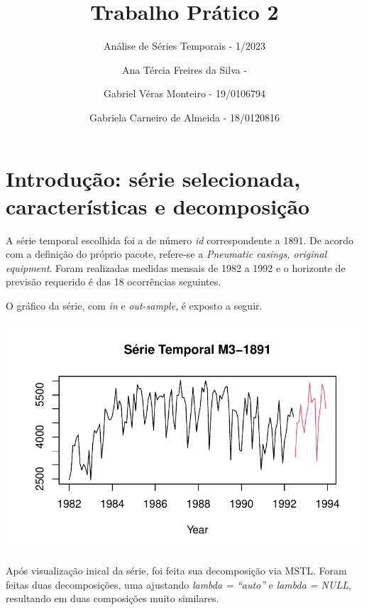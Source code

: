 \documentclass[
  letterpaper,
  DIV=11,
  numbers=noendperiod]{scrartcl}
\title{Trabalho Prático 2}
\subtitle{Análise de Séries Temporais - 1/2023}
\author{Ana Tércia Freires da Silva - \and Gabriel Véras Monteiro -
19/0106794 \and Gabriela Carneiro de Almeida - 18/0120816}
\date{}
\renewcommand*\contentsname{Table of contents}
\newcommand\contentsname{Table of contents}
\begin{document}
\maketitle
\ifdefined\Shaded\renewenvironment{Shaded}{\begin{tcolorbox}[boxrule=0pt, enhanced, interior hidden, frame hidden, sharp corners, borderline west={3pt}{0pt}{shadecolor}, breakable]}{\end{tcolorbox}}\fi

\renewcommand*\contentsname{Table of contents}
{
\hypersetup{linkcolor=}
\setcounter{tocdepth}{3}
\tableofcontents
}
\newpage{}

\hypertarget{introduuxe7uxe3o-suxe9rie-selecionada-caracteruxedsticas-e-decomposiuxe7uxe3o}{%
\section{Introdução: série selecionada, características e
decomposição}\label{introduuxe7uxe3o-suxe9rie-selecionada-caracteruxedsticas-e-decomposiuxe7uxe3o}}

A série temporal escolhida foi a de número \emph{id} correspondente a
1891. De acordo com a definição do próprio pacote, refere-se a
\emph{Pneumatic casings, original equipment}. Foram realizadas medidas
mensais de 1982 a 1992 e o horizonte de previsão requerido é das 18
ocorrências seguintes.

O gráfico da série, com \emph{in} e \emph{out-sample}, é exposto a
seguir.

\includegraphics{T2_grupo10_files/figure-pdf/plot-serie-total-1.pdf}

Após visualização inical da série, foi feita sua decomposição via MSTL.
Foram feitas duas decomposições, uma ajustando \emph{lambda = ``auto''}
e \emph{lambda = NULL}, resultando em duas composições muito similares.
\end{document}
